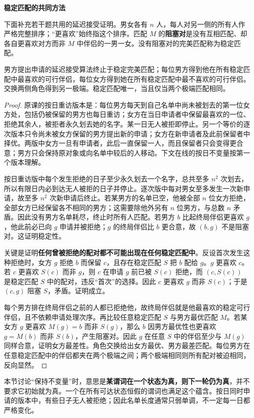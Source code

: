 \par\addvspace{7pt}\noindent\textbf{稳定匹配的共同方法}\par
下面补充若干题共用的延迟接受证明。男女各有 $n$ 人，每人对另一侧的所有人作严格完整排序；“更喜欢”始终指这个排序。匹配 $M$ 的\textbf{阻塞对}是没有互相匹配、却各自更喜欢对方而非 $M$ 中伴侣的一男一女。没有阻塞对的完美匹配称为稳定匹配。

\begin{lemma}\label{lem:6042-stable}
男方提出申请的延迟接受算法终止于稳定完美匹配；每位男方得到他在所有稳定匹配中最喜欢的可行伴侣，每位女方得到她在所有稳定匹配中最不喜欢的可行伴侣。交换两侧角色得到另一极端。稳定匹配唯一，当且仅当两个极端匹配相同。
\end{lemma}
\begin{proof}
原课的按日重访版本是：每位男方每天到自己名单中尚未被划去的第一位女方处，包括仍被保留的男方也每日重访；女方在当日申请者中保留最喜欢的一位、拒绝其余人，被拒者永久划去她的名字。某一日无人被拒即停止。另一个等价的逐次版本只令尚未被女方保留的男方提出新的申请；女方在新申请者及此前保留者中择优。两版中女方一旦有申请者，此后一直保留一人，而且保留者只会变得更合意；男方只会保持原对象或向名单中较后的人移动。下文在线的按日不变量按第一个版本理解。

按日重访版中每个发生拒绝的日子至少永久划去一个名字，总共至多 $n^2$ 次划去，所以有限日内必到达无人被拒的日子并停止。逐次版中每对男女至多发生一次新申请，故至多 $n^2$ 次新申请后终止。若某男方的名单已空，他被全部 $n$ 位女方拒绝，全部女方已经保留各不相同的男方；这需要除他外另有 $n$ 位男方，与总数 $n$ 矛盾。因此没有男方名单耗尽，终止时所有人匹配。若男方 $b$ 比起终局伴侣更喜欢 $g$，他此前必已向 $g$ 申请并被拒绝；$g$ 的终局伴侣比 $b$ 更合意，故 $(b,g)$ 不是阻塞对。这证明稳定性。

关键是证明\textbf{任何曾被拒绝的配对都不可能出现在任何稳定匹配中}。反设首次发生这种拒绝时，女方 $g$ 拒绝 $b$ 而保留 $c$，且存在稳定匹配 $S$ 把 $b$ 配给 $g$。$g$ 更喜欢 $c$。若 $c$ 更喜欢 $S(c)$ 而非 $g$，则 $c$ 在申请 $g$ 前已被 $S(c)$ 拒绝，而 $(c,S(c))$ 是稳定匹配 $S$ 中的配对，违反“首次”的选择。因此 $c$ 更喜欢 $g$ 而非 $S(c)$；于是 $(c,g)$ 阻塞 $S$，矛盾。证明成立。

每个男方排在终局伴侣之前的人都已拒绝他，故终局伴侣就是他最喜欢的稳定可行伴侣，且不依赖申请处理次序。再比较任意稳定匹配 $S$ 与男方最优匹配 $M$。若某女方 $g$ 更喜欢 $M(g)=b$ 而非 $S(g)$，那么 $b$ 因男方最优性也更喜欢 $g=M(b)$ 而非 $S(b)$，产生阻塞对。因此 $g$ 在任意 $S$ 中的伴侣至少与 $M(g)$ 同样合意，证明女方最差性。角色交换给出女方最优、男方最差匹配。每位男方在任意稳定匹配中的伴侣都夹在两个极端之间；两个极端相同则所有配对被迫相同，反向显然。
\end{proof}

本节讨论“保持不变量”时，意思是\textbf{某谓词在一个状态为真，则下一轮仍为真}，并不要求它初始就为真。一个在所有可达状态恒假的谓词也满足这个蕴含。按日同时申请的版本中，有些日子无人被拒绝；因此名单长度通常只弱单调，不一定每一日都严格变化。
